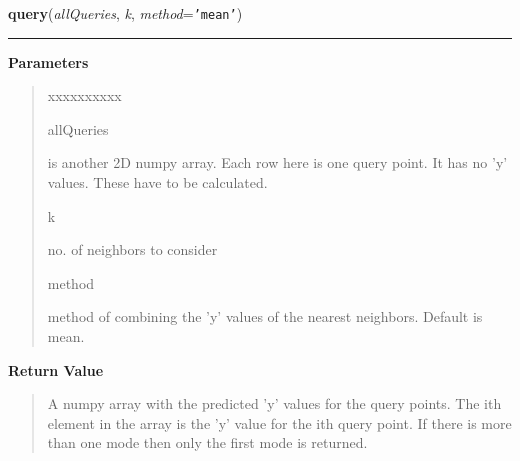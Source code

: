     \label{QSTK:qstklearn:parallelknn:query}

    \vspace{0.5ex}

\hspace{.8\funcindent}\begin{boxedminipage}{\funcwidth}

    \raggedright \textbf{query}(\textit{allQueries}, \textit{k}, \textit{method}={\tt \texttt{'}\texttt{mean}\texttt{'}})

    \vspace{-1.5ex}

    \rule{\textwidth}{0.5\fboxrule}
\setlength{\parskip}{2ex}
\setlength{\parskip}{1ex}
      \textbf{Parameters}
      \vspace{-1ex}

      \begin{quote}
        \begin{Ventry}{xxxxxxxxxx}

          \item[allQueries]

          is another 2D numpy array. Each row here is one query point. It 
          has no 'y' values. These have to be calculated.

          \item[k]

          no. of neighbors to consider

          \item[method]

          method of combining the 'y' values of the nearest neighbors. 
          Default is mean.

        \end{Ventry}

      \end{quote}

      \textbf{Return Value}
    \vspace{-1ex}

      \begin{quote}
      A numpy array with the predicted 'y' values for the query points. The
      ith element in the array is the 'y' value for the ith query point. If
      there is more than one mode then only the first mode is returned.

      \end{quote}

    \end{boxedminipage}

